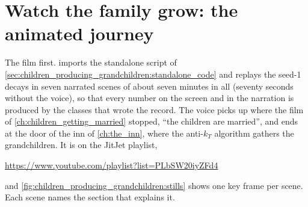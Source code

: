 \section{Watch the family grow: the animated journey}
\label{sec:children_producing_grandchildren:animation}

The film first. 
imports the standalone script of
\cref{sec:children_producing_grandchildren:standalone_code} and replays the
seed-1 decays in seven narrated scenes of about seven minutes in all
(seventy seconds without the voice), so that every number on the screen
and in the narration is produced by the classes that wrote the record.
The voice picks up where the film of \cref{ch:children_getting_married}
stopped, ``the children are married'', and ends at the door of the inn of
\cref{ch:the_inn}, where the anti-$k_T$ algorithm gathers the
grandchildren. It is on the JitJet playlist,
\begin{center}
  \url{https://www.youtube.com/playlist?list=PLbSW20iyZFd4}
\end{center}
and \cref{fig:children_producing_grandchildren:stills} shows one key frame
per scene. Each scene names the section that explains it.
